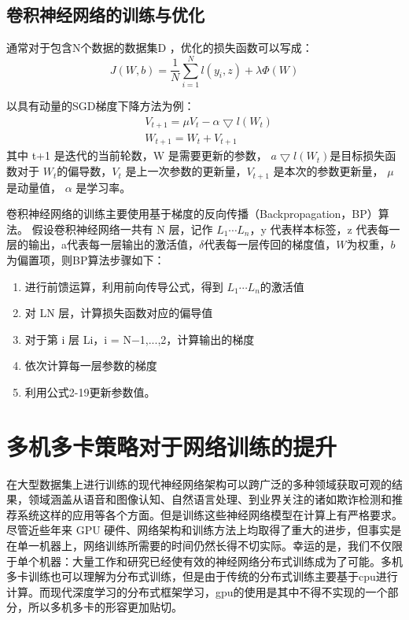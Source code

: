 \subsection{卷积神经网络的训练与优化}
 通常对于包含N个数据的数据集D ，优化的损失函数可以写成：
\begin{equation}{
J(W,b)=\frac{1}{N}\sum_{i=1}^{N}l(y_i,z)+\lambda \Phi (W)
}
\end{equation}


以具有动量的SGD梯度下降方法为例：
\begin{equation}
\begin{split}
&V_{t+1}=\mu V_t-\alpha \bigtriangledown l(W_t) \\
&W_{t+1}=W_t+V_{t+1}
\end{split}
\end{equation}
其中 t+1 是迭代的当前轮数，W 是需要更新的参数， $a \bigtriangledown l(W_t)$是目标损失函数对于 $W_t$的偏导数，$V_t$ 是上一次参数的更新量，$V_{t+1}$ 是本次的参数更新量， $\mu$ 是动量值， $\alpha$ 是学习率。

 卷积神经网络的训练主要使用基于梯度的反向传播（Backpropagation，BP）算法。 假设卷积神经网络一共有 N 层，记作 $L_1\cdots L_n$，y 代表样本标签，z 代表每一层的输出，a代表每一层输出的激活值，$\delta$代表每一层传回的梯度值，$W$为权重，$b$为偏置项，则BP算法步骤如下：
\begin{enumerate}
\item 进行前馈运算，利用前向传导公式，得到 $L_1\cdots L_n$的激活值
\item 对 LN 层，计算损失函数对应的偏导值
\item 对于第 i 层 Li，i = N−1,...,2，计算输出的梯度
\item 依次计算每一层参数的梯度
\item 利用公式2-19更新参数值。
\end{enumerate}
\section{多机多卡策略对于网络训练的提升}
在大型数据集上进行训练的现代神经网络架构可以跨广泛的多种领域获取可观的结果，领域涵盖从语音和图像认知、自然语言处理、到业界关注的诸如欺诈检测和推荐系统这样的应用等各个方面。但是训练这些神经网络模型在计算上有严格要求。尽管近些年来 GPU 硬件、网络架构和训练方法上均取得了重大的进步，但事实是在单一机器上，网络训练所需要的时间仍然长得不切实际。幸运的是，我们不仅限于单个机器：大量工作和研究已经使有效的神经网络分布式训练成为了可能。多机多卡训练也可以理解为分布式训练，但是由于传统的分布式训练主要基于cpu进行计算。而现代深度学习的分布式框架学习，gpu的使用是其中不得不实现的一个部分，所以多机多卡的形容更加贴切。

